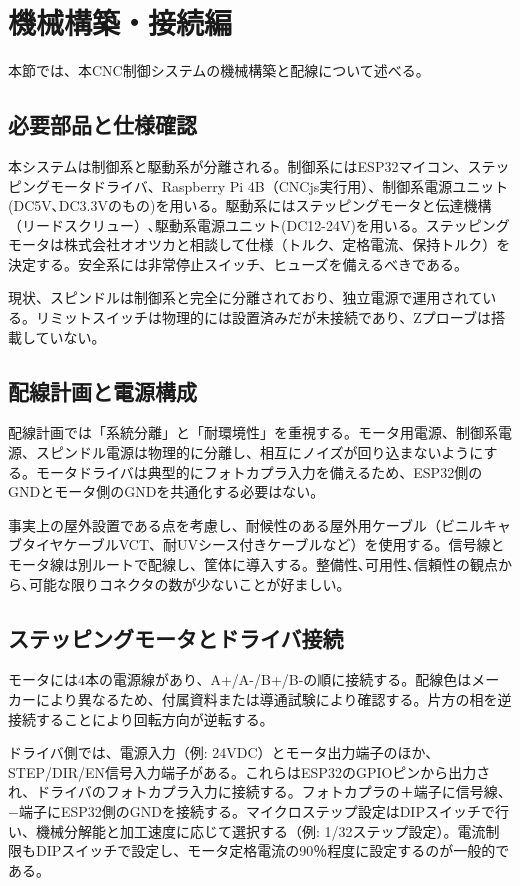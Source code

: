 \documentclass[uplatex,dvipdfmx]{ujarticle}
\begin{document}
\section{機械構築・接続編}

本節では、本CNC制御システムの機械構築と配線について述べる。


\subsection{必要部品と仕様確認}

本システムは制御系と駆動系が分離される。制御系にはESP32マイコン、ステッピングモータドライバ、Raspberry Pi 4B（CNCjs実行用）、制御系電源ユニット(DC5V､DC3.3Vのもの)を用いる。駆動系にはステッピングモータと伝達機構（リードスクリュー）､駆動系電源ユニット(DC12-24V)を用いる。ステッピングモータは株式会社オオツカと相談して仕様（トルク、定格電流、保持トルク）を決定する。安全系には非常停止スイッチ、ヒューズを備えるべきである。

現状、スピンドルは制御系と完全に分離されており、独立電源で運用されている。リミットスイッチは物理的には設置済みだが未接続であり、Zプローブは搭載していない。

\subsection{配線計画と電源構成}

配線計画では「系統分離」と「耐環境性」を重視する。モータ用電源、制御系電源、スピンドル電源は物理的に分離し、相互にノイズが回り込まないようにする。モータドライバは典型的にフォトカプラ入力を備えるため、ESP32側のGNDとモータ側のGNDを共通化する必要はない。

事実上の屋外設置である点を考慮し、耐候性のある屋外用ケーブル（ビニルキャブタイヤケーブルVCT、耐UVシース付きケーブルなど）を使用する。信号線とモータ線は別ルートで配線し、筐体に導入する。整備性､可用性､信頼性の観点から､可能な限りコネクタの数が少ないことが好ましい｡

\subsection{ステッピングモータとドライバ接続}

モータには4本の電源線があり、A+/A-/B+/B-の順に接続する。配線色はメーカーにより異なるため、付属資料または導通試験により確認する。片方の相を逆接続することにより回転方向が逆転する｡

ドライバ側では、電源入力（例: 24VDC）とモータ出力端子のほか、STEP/DIR/EN信号入力端子がある。これらはESP32のGPIOピンから出力され、ドライバのフォトカプラ入力に接続する。フォトカプラの＋端子に信号線、−端子にESP32側のGNDを接続する。マイクロステップ設定はDIPスイッチで行い、機械分解能と加工速度に応じて選択する（例: 1/32ステップ設定）。電流制限もDIPスイッチで設定し、モータ定格電流の90％程度に設定するのが一般的である。
\end{document}
